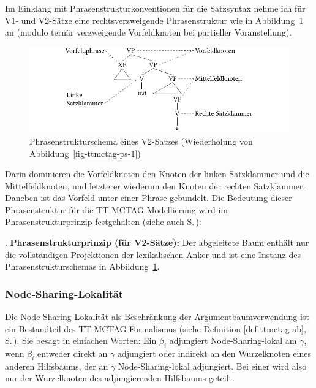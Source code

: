 Im Einklang mit Phrasenstrukturkonventionen für die Satzsyntax nehme ich für V1- und V2-Sätze eine rechtsverzweigende Phrasenstruktur wie in Abbildung~\ref{fig-ttmctag-ps-2} an (modulo ternär verzweigende Vorfeldknoten bei partieller Voranstellung).
\begin{figure}[t]
\centering
\includegraphics{graphics/abb726.pdf}
\caption{\label{fig-ttmctag-ps-2}Phrasenstrukturschema eines V2-Satzes (Wiederholung von Abbildung~\ref{fig-ttmctag-ps-1})}
\end{figure} 
Darin dominieren die Vorfeldknoten den Knoten der linken Satzklammer und die Mittelfeldknoten, und letzterer wiederum den Knoten der rechten Satzklammer. Daneben ist das Vorfeld unter einer Phrase gebündelt. Die Bedeutung dieser Phrasenstruktur für die TT-MCTAG-Modellierung wird im Phrasenstrukturprinzip festgehalten (siehe auch S.\,\pageref{ex-psprinzip}):

\ex. {\bf Phrasenstrukturprinzip (für V2-Sätze):}
Der abgeleitete Baum enthält nur die vollständigen Projektionen der lexikalischen Anker und ist eine Instanz des Phrasenstrukturschemas in Abbildung~\ref{fig-ttmctag-ps-2}.


\subsubsection*{Node-Sharing-Lokalität}

Die Node-Sharing-Lokalität als Beschränkung der Argumentbaumverwendung ist ein Bestandteil des TT-MCTAG-Formalismus (siehe Definition \ref{def-ttmctag-ab}, S.\,\pageref{def-ttmctag-ab}). Sie besagt in einfachen Worten: Ein  $\beta_i$ adjungiert Node-Sharing-lokal am  $\gamma$, wenn $\beta_i$ entweder direkt an $\gamma$ adjungiert oder indirekt an den Wurzelknoten eines anderen Hilfsbaums, der an $\gamma$ Node-Sharing-lokal adjungiert. Bei einer  wird also nur der Wurzelknoten des adjungierenden Hilfsbaums geteilt.  

